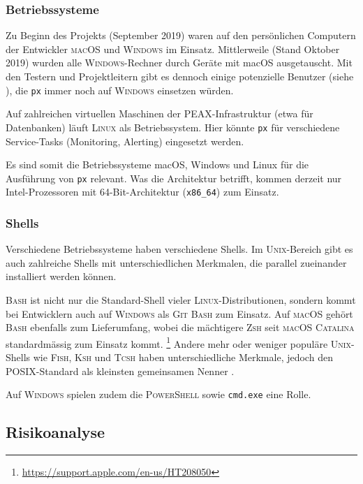 \subsubsection{Betriebssysteme}

Zu Beginn des Projekts (September 2019) waren auf den persönlichen Computern der Entwickler \textsc{macOS} und \textsc{Windows} im Einsatz. Mittlerweile (Stand Oktober 2019) wurden alle \textsc{Windows}-Rechner durch Geräte mit macOS ausgetauscht. Mit den Testern und Projektleitern gibt es dennoch einige potenzielle Benutzer (siehe ), die \texttt{px} immer noch auf \textsc{Windows} einsetzen würden.

Auf zahlreichen virtuellen Maschinen der PEAX-Infrastruktur (etwa für Datenbanken) läuft \textsc{Linux} als Betriebssystem. Hier könnte \texttt{px} für verschiedene Service-Tasks (Monitoring, Alerting) eingesetzt werden.

Es sind somit die Betriebssysteme macOS, Windows und Linux für die Ausführung von \texttt{px} relevant. Was die Architektur betrifft, kommen derzeit nur Intel-Prozessoren mit 64-Bit-Architektur (\texttt{x86\_64}) zum Einsatz.

\subsubsection{Shells} 

Verschiedene Betriebssysteme haben verschiedene Shells. Im \textsc{Unix}-Bereich gibt es auch zahlreiche Shells mit unterschiedlichen Merkmalen, die parallel zueinander installiert werden können.

\textsc{Bash} ist nicht nur die Standard-Shell vieler \textsc{Linux}-Distributionen, sondern kommt bei Entwicklern auch auf \textsc{Windows} als \textsc{Git Bash} zum Einsatz. Auf \textsc{macOS} gehört \textsc{Bash} ebenfalls zum Lieferumfang, wobei die mächtigere \textsc{Zsh} seit \textsc{macOS Catalina} standardmässig zum Einsatz kommt. \footnote{\url{https://support.apple.com/en-us/HT208050}} Andere mehr oder weniger populäre \textsc{Unix}-Shells wie \textsc{Fish}, \textsc{Ksh} und \textsc{Tcsh} haben unterschiedliche Merkmale, jedoch den \textsc{POSIX}-Standard als kleinsten gemeinsamen Nenner \cite{posix-shell}.

Auf \textsc{Windows} spielen zudem die \textsc{PowerShell} sowie \texttt{cmd.exe} eine Rolle.

\subsection{Risikoanalyse}

